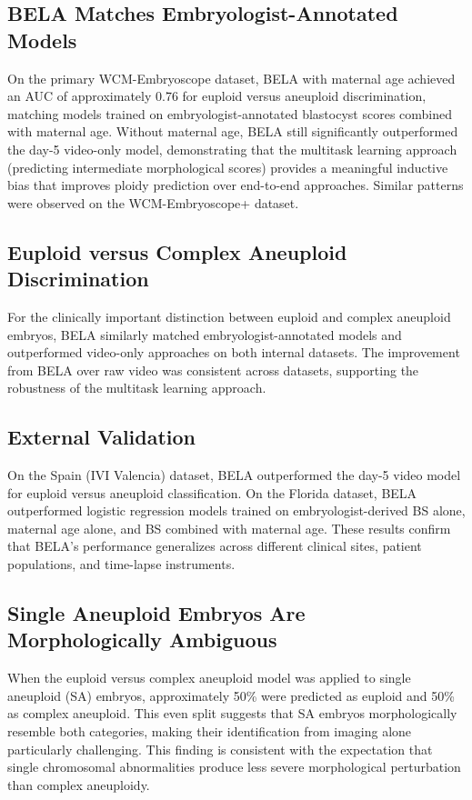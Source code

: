 \documentclass[11pt]{article}
\begin{document}
\subsection{BELA Matches Embryologist-Annotated Models}

On the primary WCM-Embryoscope dataset, BELA with maternal age achieved an AUC of approximately 0.76 for euploid versus aneuploid discrimination, matching models trained on embryologist-annotated blastocyst scores combined with maternal age. Without maternal age, BELA still significantly outperformed the day-5 video-only model, demonstrating that the multitask learning approach (predicting intermediate morphological scores) provides a meaningful inductive bias that improves ploidy prediction over end-to-end approaches. Similar patterns were observed on the WCM-Embryoscope+ dataset.

\subsection{Euploid versus Complex Aneuploid Discrimination}

For the clinically important distinction between euploid and complex aneuploid embryos, BELA similarly matched embryologist-annotated models and outperformed video-only approaches on both internal datasets. The improvement from BELA over raw video was consistent across datasets, supporting the robustness of the multitask learning approach.

\subsection{External Validation}

On the Spain (IVI Valencia) dataset, BELA outperformed the day-5 video model for euploid versus aneuploid classification. On the Florida dataset, BELA outperformed logistic regression models trained on embryologist-derived BS alone, maternal age alone, and BS combined with maternal age. These results confirm that BELA's performance generalizes across different clinical sites, patient populations, and time-lapse instruments.

\subsection{Single Aneuploid Embryos Are Morphologically Ambiguous}

When the euploid versus complex aneuploid model was applied to single aneuploid (SA) embryos, approximately 50\% were predicted as euploid and 50\% as complex aneuploid. This even split suggests that SA embryos morphologically resemble both categories, making their identification from imaging alone particularly challenging. This finding is consistent with the expectation that single chromosomal abnormalities produce less severe morphological perturbation than complex aneuploidy.
\end{document}
